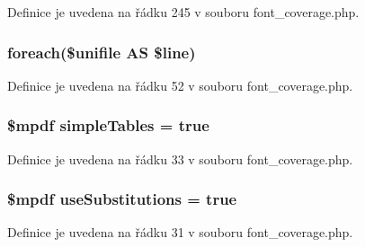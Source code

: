 Definice je uvedena na řádku 245 v souboru font\-\_\-coverage.\-php.

\hypertarget{font__coverage_8php_afa3e0d7f4c07331bb8ee7bd7e2008de6}{
\subsubsection[{foreach}]{\setlength{\rightskip}{0pt plus 5cm}foreach(\$unifile A\-S \$line)}}\label{font__coverage_8php_afa3e0d7f4c07331bb8ee7bd7e2008de6}


Definice je uvedena na řádku 52 v souboru font\-\_\-coverage.\-php.

\hypertarget{font__coverage_8php_a87bf4d3d8114a506fea7f0fc5f0714f6}{
\subsubsection[{simple\-Tables}]{\setlength{\rightskip}{0pt plus 5cm}\$mpdf simple\-Tables = true}}\label{font__coverage_8php_a87bf4d3d8114a506fea7f0fc5f0714f6}


Definice je uvedena na řádku 33 v souboru font\-\_\-coverage.\-php.

\hypertarget{font__coverage_8php_aa2ce4c2c0ab99d3365e4d7366a9be33a}{
\subsubsection[{use\-Substitutions}]{\setlength{\rightskip}{0pt plus 5cm}\$mpdf use\-Substitutions = true}}\label{font__coverage_8php_aa2ce4c2c0ab99d3365e4d7366a9be33a}


Definice je uvedena na řádku 31 v souboru font\-\_\-coverage.\-php.

